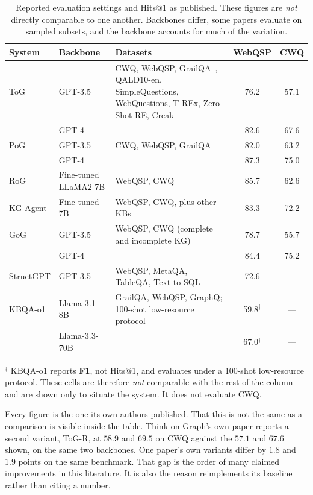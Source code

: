 \begin{table}[!tb]
  \begin{center}
    \caption[Reported evaluation settings and Hits@1 as published]{Reported
    evaluation settings and Hits@1 as published. These figures are \emph{not}
    directly comparable to one another. Backbones differ, some papers evaluate
    on sampled subsets, and the backbone accounts for much of the variation.}
    \label{tab:reported}
    \footnotesize
    \begin{tabular}{|l|l|L{45mm}|c|c|}
      \hline
      \textbf{System} & \textbf{Backbone} & \textbf{Datasets} & \textbf{WebQSP}
      & \textbf{CWQ} \\
      \hline
      ToG & GPT-3.5 & CWQ, WebQSP, GrailQA~\cite{gu2021beyond}, QALD10-en,
      SimpleQuestions, WebQuestions, T-REx, Zero-Shot RE, Creak & 76.2 & 57.1 \\
       & GPT-4 & & 82.6 & 67.6 \\
      \hline
      PoG & GPT-3.5 & CWQ, WebQSP, GrailQA & 82.0 & 63.2 \\
       & GPT-4 & & 87.3 & 75.0 \\
      \hline
      RoG & Fine-tuned LLaMA2-7B & WebQSP, CWQ & 85.7 & 62.6 \\
      \hline
      KG-Agent & Fine-tuned 7B & WebQSP, CWQ, plus other KBs & 83.3 & 72.2 \\
      \hline
      GoG & GPT-3.5 & WebQSP, CWQ (complete and incomplete KG) & 78.7 & 55.7 \\
       & GPT-4 & & 84.4 & 75.2 \\
      \hline
      StructGPT & GPT-3.5 & WebQSP, MetaQA, TableQA, Text-to-SQL & 72.6 & --- \\
      \hline
      KBQA-o1 & Llama-3.1-8B & GrailQA, WebQSP, GraphQ; 100-shot low-resource
      protocol & 59.8$^{\dagger}$ & --- \\
       & Llama-3.3-70B & & 67.0$^{\dagger}$ & --- \\
      \hline
    \end{tabular}

    \vspace{1mm}
    {\footnotesize $^{\dagger}$ KBQA-o1 reports \textbf{F1}, not Hits@1, and
    evaluates under a 100-shot low-resource protocol. These cells are therefore
    \emph{not} comparable with the rest of the column and are shown only to
    situate the system. It does not evaluate CWQ.

    \vspace{0.7mm}
    Every figure is the one its own authors published. That this is not the same
    as a comparison is visible inside the table. Think-on-Graph's own paper
    reports a second variant, ToG-R, at $58.9$ and $69.5$ on CWQ against the
    $57.1$ and $67.6$ shown, on the same two backbones. One paper's own variants
    differ by $1.8$ and $1.9$ points on the same benchmark. That gap is the
    order of many claimed improvements in this literature. It is also the reason
     reimplements its baseline rather than citing a number.}
  \end{center}
\end{table}

